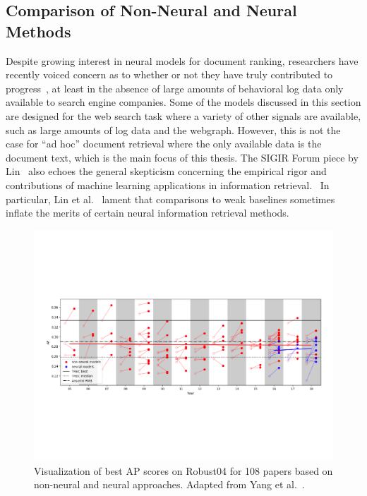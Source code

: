 \subsection{Comparison of Non-Neural and Neural Methods}

Despite growing interest in neural models for document ranking, researchers have recently voiced concern as to whether or not they have truly contributed to progress~\cite{lin2019neural}, at least in the absence of large amounts of behavioral log data only available to search engine companies.
Some of the models discussed in this section are designed for the web search task where a variety of other signals are available, such as large amounts of log data and the webgraph.
However, this is not the case for ``ad hoc'' document retrieval where the only available data is the document text, which is the main focus of this thesis.
The SIGIR Forum piece by Lin~\cite{lin2019neural} also echoes the general skepticism concerning the empirical rigor and contributions of machine learning applications in information retrieval.~\cite{lipton2018troubling, sculley2018winner}
In particular, Lin et al.~\cite{lin2019neural} lament that comparisons to weak baselines sometimes inflate the merits of certain neural information retrieval methods.

\begin{figure}[b!]
\centering
  \includegraphics[width=6.5in]{figures/neural_robust04.pdf}
\caption{Visualization of best AP scores on Robust04 for 108 papers based on non-neural and neural approaches. Adapted from Yang et al.~\cite{Yang_etal_SIGIR2019}.}
\label{fig:neural_robust04}
\end{figure}

